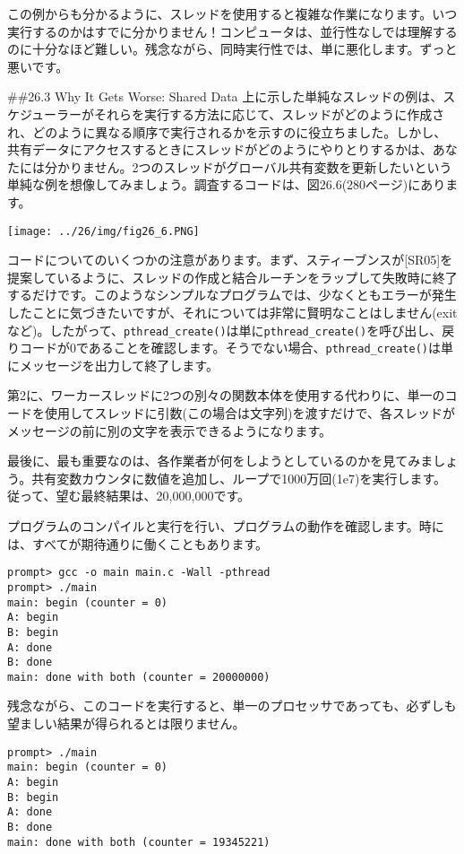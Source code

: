 この例からも分かるように、スレッドを使用すると複雑な作業になります。いつ実行するのかはすでに分かりません！コンピュータは、並行性なしでは理解するのに十分なほど難しい。残念ながら、同時実行性では、単に悪化します。ずっと悪いです。

\#\#26.3 Why It Gets Worse: Shared Data
上に示した単純なスレッドの例は、スケジューラーがそれらを実行する方法に応じて、スレッドがどのように作成され、どのように異なる順序で実行されるかを示すのに役立ちました。しかし、共有データにアクセスするときにスレッドがどのようにやりとりするかは、あなたには分かりません。2つのスレッドがグローバル共有変数を更新したいという単純な例を想像してみましょう。調査するコードは、図26.6(280ページ)にあります。

\texttt{[image: ../26/img/fig26\_6.PNG]}

コードについてのいくつかの注意があります。まず、スティーブンスが{[}SR05{]}を提案しているように、スレッドの作成と結合ルーチンをラップして失敗時に終了するだけです。このようなシンプルなプログラムでは、少なくともエラーが発生したことに気づきたいですが、それについては非常に賢明なことはしません(exitなど)。したがって、\texttt{pthread\_create()}は単に\texttt{pthread\_create()}を呼び出し、戻りコードが0であることを確認します。そうでない場合、\texttt{pthread\_create()}は単にメッセージを出力して終了します。

第2に、ワーカースレッドに2つの別々の関数本体を使用する代わりに、単一のコードを使用してスレッドに引数(この場合は文字列)を渡すだけで、各スレッドがメッセージの前に別の文字を表示できるようになります。

最後に、最も重要なのは、各作業者が何をしようとしているのかを見てみましょう。共有変数カウンタに数値を追加し、ループで1000万回(1e7)を実行します。従って、望む最終結果は、20,000,000です。

プログラムのコンパイルと実行を行い、プログラムの動作を確認します。時には、すべてが期待通りに働くこともあります。

\begin{verbatim}
prompt> gcc -o main main.c -Wall -pthread
prompt> ./main
main: begin (counter = 0)
A: begin
B: begin
A: done
B: done
main: done with both (counter = 20000000)
\end{verbatim}

残念ながら、このコードを実行すると、単一のプロセッサであっても、必ずしも望ましい結果が得られるとは限りません。

\begin{verbatim}
prompt> ./main
main: begin (counter = 0)
A: begin
B: begin
A: done
B: done
main: done with both (counter = 19345221)
\end{verbatim}

